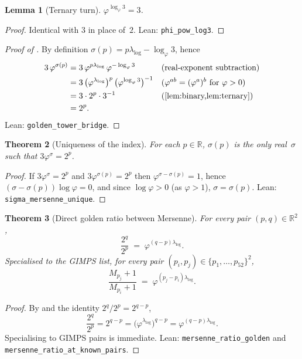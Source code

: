 \documentclass[11pt]{amsart}
\newtheorem{Theorem}{Theorem}[section]
\newtheorem{Lemma}[Theorem]{Lemma}
\theoremstyle{definition}
\newcommand{\golden}{\varphi}
\newcommand{\lean}[1]{\texttt{#1}}
\begin{document}
\begin{Lemma}[Ternary turn]\label{lem:ternary}
$\golden^{\log_{\golden} 3} = 3$.
\end{Lemma}

\begin{proof}
Identical with $3$ in place of~$2$.  Lean: \lean{phi\_pow\_log3}.
\end{proof}

\begin{proof}[Proof of ]
By definition $\sigma(p)=p\lambda_{\log}-\log_{\golden}3$, hence
\begin{align*}
  3\,\golden^{\sigma(p)}
  &= 3\,\golden^{p\lambda_{\log}}\,\golden^{-\log_{\golden}3}
  &&\text{(real-exponent subtraction)}\\
  &= 3\,\bigl(\golden^{\lambda_{\log}}\bigr)^{p}\,
       \bigl(\golden^{\log_{\golden}3}\bigr)^{-1}
  &&\text{($\golden^{ab}=(\golden^{a})^{b}$ for $\golden>0$)}\\
  &= 3\cdot 2^{p}\cdot 3^{-1}
  &&\text{(\Cref{lem:binary,lem:ternary})}\\
  &= 2^{p}. \qedhere
\end{align*}
Lean: \lean{golden\_tower\_bridge}.
\end{proof}

\begin{Theorem}[Uniqueness of the index]\label{thm:unique}
For each $p\in\mathbb{R}$, $\sigma(p)$ is the only real~$\sigma$ such that
$3\golden^{\sigma}=2^{p}$.
\end{Theorem}

\begin{proof}
If $3\golden^{\sigma}=2^{p}$ and $3\golden^{\sigma(p)}=2^{p}$ then
$\golden^{\sigma-\sigma(p)}=1$, hence
$(\sigma-\sigma(p))\log\golden=0$, and since $\log\golden>0$ (as
$\golden>1$), $\sigma=\sigma(p)$.  Lean:
\lean{sigma\_mersenne\_unique}.
\end{proof}

\begin{Theorem}[Direct golden ratio between Mersenne]\label{thm:ratio-main}
For every pair $(p,q)\in\mathbb{R}^{2}$,
\[
  \frac{2^{q}}{2^{p}} \;=\; \golden^{(q-p)\lambda_{\log}}.
\]
Specialised to the GIMPS list, for every pair
$(p_{i},p_{j})\in\{p_{1},\ldots,p_{52}\}^{2}$,
\[
  \frac{M_{p_{j}}+1}{M_{p_{i}}+1} \;=\; \golden^{(p_{j}-p_{i})\lambda_{\log}}.
\]
\end{Theorem}

\begin{proof}
By  and the identity $2^{q}/2^{p}=2^{q-p}$,
\[
  \frac{2^{q}}{2^{p}}
  = 2^{q-p}
  = \bigl(\golden^{\lambda_{\log}}\bigr)^{q-p}
  = \golden^{(q-p)\lambda_{\log}}.
\]
Specialising to GIMPS pairs is immediate.  Lean:
\lean{mersenne\_ratio\_golden} and
\lean{mersenne\_ratio\_at\_known\_pairs}.
\end{proof}
\end{document}
